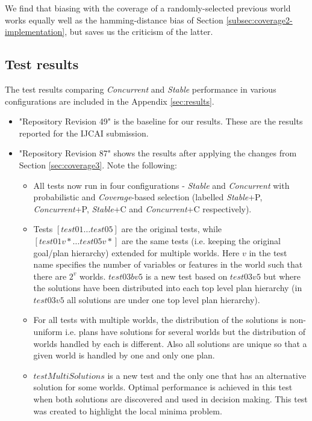 \documentclass[a4paper]{article}
\newcommand{\cc}{\emph{Concurrent}\xspace}
\newcommand{\st}{\emph{Stable}\xspace}
\newcommand{\cov}{\emph{Coverage}\xspace}
\begin{document}
We find that biasing with the coverage of a randomly-selected previous world works equally well as the hamming-distance bias of Section \ref{subsec:coverage2-implementation}, but saves us the criticism of the latter.


\subsection{Test results}
\label{subsec:results-coverage3}

The test results comparing \cc and \st performance in various configurations are included in the Appendix \ref{sec:results}.
\begin{itemize}
\item "Repository Revision 49" is the baseline for our results. These are the results reported for the IJCAI submission.
\item "Repository Revision 87" shows the results after applying the changes from Section \ref{sec:coverage3}. Note the following:
\begin{itemize}
\item All tests now run in four configurations - \st and \cc with probabilistic and \cov-based selection (labelled {\st}+P, {\cc}+P, {\st}+C and {\cc}+C respectively).
\item Tests $[test01 \ldots test05]$ are the original tests, while  $[test01v* \ldots test05v*]$ are the same tests (i.e. keeping the original goal/plan hierarchy) extended for multiple worlds. Here $v$ in the test name specifies the number of variables or features in the world such that there are $2^v$ worlds. $test03bv5$ is a new test based on $test03v5$ but where the solutions have been distributed into each top level plan hierarchy (in $test03v5$ all solutions are under one top level plan hierarchy).
\item For all tests with multiple worlds, the distribution of the solutions is non-uniform i.e. plans have solutions for several worlds but the distribution of worlds handled by each is different. Also all solutions are unique so that a given world is handled by one and only one plan.
\item $testMultiSolutions$ is a new test and the only one that has an alternative solution for some worlds. Optimal performance is achieved in this test when both solutions are discovered and used in decision making. This test was created to highlight the local minima problem.
\end{itemize}
\end{itemize}
\end{document}
